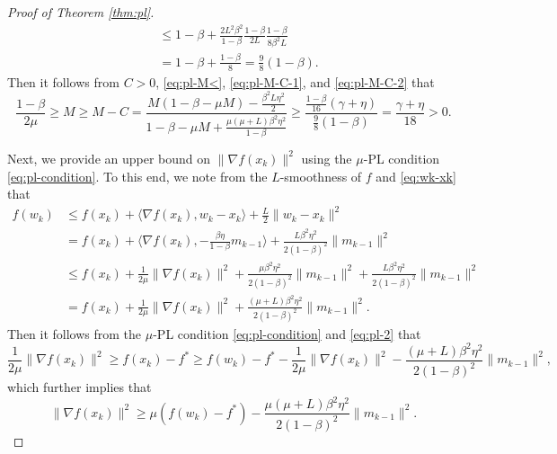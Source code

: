 \documentclass[10pt]{article}
\numberwithin{equation}{section}
\theoremstyle{definition}
\begin{document}
\begin{proof}[Proof of Theorem \ref{thm:pl}]
\begin{equation}
\begin{aligned}
& \leq 1-\beta+\frac{2L^2 \beta^2}{1-\beta}\frac{1-\beta}{2 L}\frac{1-\beta}{8 \beta^2 L} \\
& = 1-\beta+\frac{1-\beta}{8} = \frac{9}{8}(1-\beta).
\end{aligned}
\end{equation}
Then it follows from $C>0$, \eqref{eq:pl-M<}, \eqref{eq:pl-M-C-1}, and \eqref{eq:pl-M-C-2} that
\begin{equation}\label{eq:pl-M-C-3}
\frac{1-\beta}{2 \mu} \ge M \ge M-C=\frac{M(1-\beta-\mu M)-\frac{\beta^2 L \eta^2}{2}}{1-\beta-\mu M+\frac{\mu(\mu+L) \beta^2 \eta^2}{1-\beta}} \ge \frac{\frac{1-\beta}{16}(\gamma+\eta)}{\frac{9}{8}(1-\beta)}=\frac{\gamma+\eta}{18}>0.
\end{equation}

Next, we provide an upper bound on $\|\nabla f(x_k)\|^2$ using the $\mu$-PL condition \eqref{eq:pl-condition}. To this end, we note from the $L$-smoothness of $f$ and \eqref{eq:wk-xk} that
\begin{equation}\label{eq:pl-2}
\begin{aligned}
f(w_k) & \leq f(x_k)+\langle\nabla f(x_k), w_k-x_k\rangle+\frac{L}{2}\|w_k-x_k\|^2 \\
& =f(x_k)+\Big\langle\nabla f(x_k),-\frac{\beta \eta}{1-\beta} m_{k-1}\Big\rangle+\frac{L \beta^2 \eta^2}{2(1-\beta)^2}\|m_{k-1}\|^2 \\
& \leq f(x_k)+\frac{1}{2\mu}\|\nabla f(x_k)\|^2+\frac{\mu\beta^2\eta^2}{2 (1-\beta)^2}\|m_{k-1}\|^2+\frac{L \beta^2 \eta^2}{2(1-\beta)^2}\|m_{k-1}\|^2 \\
& =f(x_k)+\frac{1}{2\mu}\|\nabla f(x_k)\|^2+\frac{(\mu+L)\beta^2 \eta^2}{2(1-\beta)^2}\|m_{k-1}\|^2.
\end{aligned}
\end{equation}
Then it follows from the $\mu$-PL condition \eqref{eq:pl-condition} and \eqref{eq:pl-2} that
\[
\frac{1}{2 \mu}\|\nabla f(x_k)\|^2 \ge f(x_k)-f^* \ge f(w_k)-f^*-\frac{1}{2\mu}\|\nabla f(x_k)\|^2-\frac{(\mu+L)\beta^2 \eta^2}{2(1-\beta)^2}\|m_{k-1}\|^2,
\]
which further implies that
\begin{equation}\label{eq:pl-nabla_k}
\|\nabla f(x_k)\|^2 \ge \mu(f(w_k)-f^*)-\frac{\mu (\mu+L)\beta^2 \eta^2}{2(1-\beta)^2}\|m_{k-1}\|^2.
\end{equation}


\end{proof}
\end{document}
